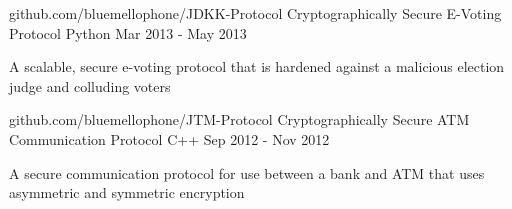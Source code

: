 \begin{cventries}
  \cventry
    {github.com/bluemellophone/JDKK-Protocol} %
    {Cryptographically Secure E-Voting Protocol} %
    {Python} %
    {Mar 2013 - May 2013} %
    {
      \begin{cvitems} %
        \item {A scalable, secure e-voting protocol that is hardened against a malicious election judge and colluding voters}
      \end{cvitems}
    }

  \cventry
    {github.com/bluemellophone/JTM-Protocol} %
    {Cryptographically Secure ATM Communication Protocol} %
    {C++} %
    {Sep 2012 - Nov 2012} %
    {
      \begin{cvitems} %
        \item {A secure communication protocol for use between a bank and ATM that uses asymmetric and symmetric encryption}
      \end{cvitems}
    }

\end{cventries}

